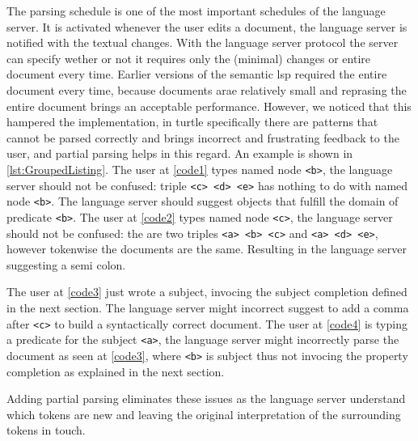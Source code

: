 The parsing schedule is one of the most important schedules of the language server.
It is activated whenever the user edits a document, the language server is notified with the textual changes.
With the language server protocol the server can specify wether or not it requires only the (minimal) changes or entire document every time.
Earlier versions of the semantic lsp required the entire document every time, because documents arae relatively small and reprasing the entire document brings an acceptable performance.
However, we noticed that this hampered the implementation, in turtle specifically there are patterns that cannot be parsed correctly and brings incorrect and frustrating feedback to the user, and partial parsing helps in this regard.
An example is shown in \ref{lst:GroupedListing}.
  The user at \ref{code1} types named node \texttt{<b>}, the language server should not be confused: triple \texttt{<c> <d> <e>} has nothing to do with named node \texttt{<b>}. The language server should suggest objects that fulfill the domain of predicate \texttt{<b>}. 
  The user at \ref{code2} types named node \texttt{<c>}, the language server should not be confused: the are two triples \texttt{<a> <b> <c>} and \texttt{<a> <d> <e>}, however tokenwise the documents are the same. Resulting in the language server suggesting a semi colon.
  
  The user at \ref{code3} just wrote a subject, invocing the subject completion defined in the next section. The language server might incorrect suggest to add a comma after \texttt{<c>} to build a syntactically correct document.
  The user at \ref{code4} is typing a predicate for the subject \texttt{<a>}, the language server might incorrectly parse the document as seen at \ref{code3}, where \texttt{<b>} is subject thus not invocing the property completion as explained in the next section.

  Adding partial parsing eliminates these issues as the language server understand which tokens are new and leaving the original interpretation of the surrounding tokens in touch.


